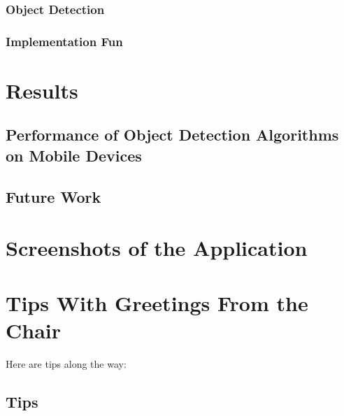 \documentclass[11pt,
               a4paper,
               bibtotoc,
               idxtotoc,
               headsepline,
               footsepline,
               footexclude,
               BCOR12mm,
               DIV13,
               openany,   %
               ]
               {scrbook}
\begin{document}
\subsection{Object Detection}
\subsection{Implementation Fun}


\chapter{Results}

\section{Performance of Object Detection Algorithms on Mobile Devices}

\section{Future Work} %


\appendix

\chapter{Screenshots of the Application}

\chapter{Tips With Greetings From the Chair}
\label{sec:tips}       %
Here are tips along the way:

\section{Tips}
\end{document}
